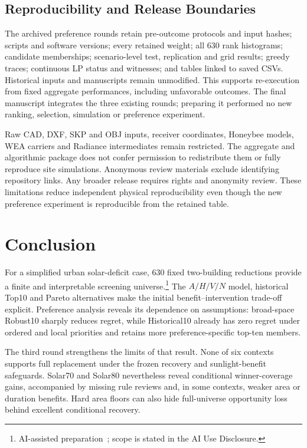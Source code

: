 \documentclass{llncs}
\newcommand{\aidraft}{\footnote{AI-assisted preparation~\cite{openai2026}; scope is stated in the AI Use Disclosure.}}
\begin{document}
\subsection{Reproducibility and Release Boundaries}
The archived preference rounds retain pre-outcome protocols and input hashes; scripts and software versions; every retained weight; all 630 rank histograms; candidate memberships; scenario-level test, replication and grid results; greedy traces; continuous LP status and witnesses; and tables linked to saved CSVs. Historical inputs and manuscripts remain unmodified. This supports re-execution from fixed aggregate performances, including unfavorable outcomes. The final manuscript integrates the three existing rounds; preparing it performed no new ranking, selection, simulation or preference experiment.

Raw CAD, DXF, SKP and OBJ inputs, receiver coordinates, Honeybee models, WEA carriers and Radiance intermediates remain restricted. The aggregate and algorithmic package does not confer permission to redistribute them or fully reproduce site simulations. Anonymous review materials exclude identifying repository links. Any broader release requires rights and anonymity review. These limitations reduce independent physical reproducibility even though the new preference experiment is reproducible from the retained table.

\section{Conclusion}
For a simplified urban solar-deficit case, 630 fixed two-building reductions provide a finite and interpretable screening universe.\aidraft{} The $A/H/V/N$ model, historical Top10 and Pareto alternatives make the initial benefit--intervention trade-off explicit. Preference analysis reveals its dependence on assumptions: broad-space Robust10 sharply reduces regret, while Historical10 already has zero regret under ordered and local priorities and retains more preference-specific top-ten members.

The third round strengthens the limits of that result. None of six contexts supports full replacement under the frozen recovery and sunlight-benefit safeguards. Solar70 and Solar80 nevertheless reveal conditional winner-coverage gains, accompanied by missing rule reviews and, in some contexts, weaker area or duration benefits. Hard area floors can also hide full-universe opportunity loss behind excellent conditional recovery.
\end{document}
